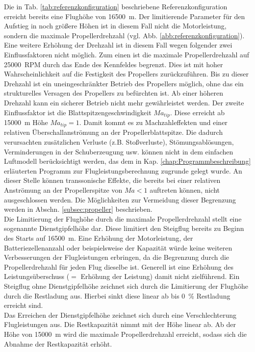 Die in Tab. \ref{tab:referenzkonfiguration} beschriebene Referenzkonfiguration erreicht bereits eine Flughöhe von \SI{16500}{m}. Der limitierende Parameter für den Aufstieg in noch größere Höhen ist in diesem Fall nicht die Motorleistung, sondern die maximale Propellerdrehzahl (vgl. Abb. \ref{abb:referenzkonfiguration}). Eine weitere Erhöhung der Drehzahl ist in diesem Fall wegen folgender zwei Einflussfaktoren nicht möglich. Zum einen ist die maximale Propellerdrehzahl auf \SI{25000}{RPM} durch das Ende des Kennfeldes begrenzt. Dies ist mit hoher Wahrscheinlichkeit auf die Festigkeit des Propellers zurückzuführen. Bis zu dieser Drehzahl ist ein uneingeschränkter Betrieb des Propellers möglich, ohne das ein strukturelles Versagen des Propellers zu befürchten ist. Ab einer höheren Drehzahl kann ein sicherer Betrieb nicht mehr gewährleistet werden. Der zweite Einflussfaktor ist die Blattspitzengeschwindigkeit \ensuremath{Ma_{tip}}. Diese erreicht ab \SI{15000}{m} Höhe \ensuremath{Ma_{tip} = 1}. Damit kommt es zu Machzahleffekten und einer relativen Überschallanströmung an der Propellerblattspitze. Die dadurch verursachten zusätzlichen Verluste (z.B. Stoßverluste), Stömungsablösungen, Verminderungen in der Schuberzeugung usw. können nicht in dem einfachen Luftmodell berücksichtigt werden, das dem in Kap. \ref{chap:Programmbeschreibung} erläuterten Programm zur Flugleistungsberechnung zugrunde gelegt wurde. An dieser Stelle können transsonische Effekte, die bereits bei einer relativen Anströmung an der Propellerspitze von \ensuremath{Ma < 1} auftreten können, nicht ausgeschlossen werden. Die Möglichkeiten zur Vermeidung dieser Begrenzung werden in Abschn. \ref{subsec:propeller} beschrieben. \\
Die Limitierung der Flughöhe durch die maximale Propellerdrehzahl stellt eine sogenannte Dienstgipfelhöhe dar. Diese limitiert den Steigflug bereits zu Beginn des Starts auf \SI{16500}{m}. Eine Erhöhung der Motorleistung, der Batteriezellenanzahl oder beispielsweise der Kapazität würde keine weiteren Verbesserungen der Flugleistungen erbringen, da die Begrenzung durch die Propellerdrehzahl für jeden Flug dieselbe ist. Generell ist eine Erhöhung des Leistungsüberschuss (\ensuremath{=} Erhöhung der Leistung) damit nicht zielführend. Ein Steigflug ohne Dienstgipfelhöhe zeichnet sich durch die Limitierung der Flughöhe durch die Restladung aus. Hierbei sinkt diese linear ab bis \SI{0}{\%} Restladung erreicht sind. \\
Das Erreichen der Dienstgipfelhöhe zeichnet sich durch eine Verschlechterung Flugleistungen aus. Die Restkapazität nimmt mit der Höhe linear ab. Ab der Höhe von \SI{15000}{m} wird die maximale Propellerdrehzahl erreicht, sodass sich die Abnahme der Restkapazität erhöht. \\
